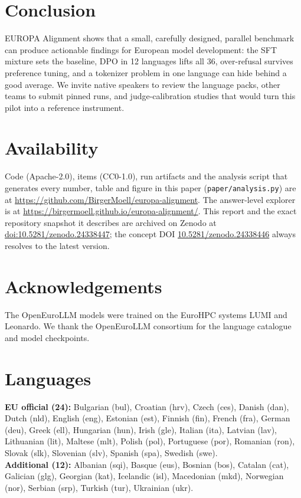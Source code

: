\documentclass[11pt]{article}
\begin{document}
\section{Conclusion}
EUROPA Alignment shows that a small, carefully designed, parallel benchmark can produce actionable findings for European model development: the SFT mixture sets the baseline, DPO in 12 languages lifts all 36, over-refusal survives preference tuning, and a tokenizer problem in one language can hide behind a good average. We invite native speakers to review the language packs, other teams to submit pinned runs, and judge-calibration studies that would turn this pilot into a reference instrument.

\section*{Availability}
\label{sec:availability}
Code (Apache-2.0), items (CC0-1.0), run artifacts and the analysis script that generates every number, table and figure in this paper (\texttt{paper/analysis.py}) are at \url{https://github.com/BirgerMoell/europa-alignment}. The answer-level explorer is at \url{https://birgermoell.github.io/europa-alignment/}. This report and the exact repository snapshot it describes are archived on Zenodo at \href{https://doi.org/10.5281/zenodo.24338447}{doi:10.5281/zenodo.24338447}; the concept DOI \href{https://doi.org/10.5281/zenodo.24338446}{10.5281/zenodo.24338446} always resolves to the latest version.

\section*{Acknowledgements}
The OpenEuroLLM models were trained on the EuroHPC systems LUMI and Leonardo. We thank the OpenEuroLLM consortium for the language catalogue and model checkpoints.




\appendix
\section{Languages}
\label{app:languages}
\small
\noindent\textbf{EU official (24):} Bulgarian (bul), Croatian (hrv), Czech (ces), Danish (dan), Dutch (nld), English (eng), Estonian (est), Finnish (fin), French (fra), German (deu), Greek (ell), Hungarian (hun), Irish (gle), Italian (ita), Latvian (lav), Lithuanian (lit), Maltese (mlt), Polish (pol), Portuguese (por), Romanian (ron), Slovak (slk), Slovenian (slv), Spanish (spa), Swedish (swe).\\
\textbf{Additional (12):} Albanian (sqi), Basque (eus), Bosnian (bos), Catalan (cat), Galician (glg), Georgian (kat), Icelandic (isl), Macedonian (mkd), Norwegian (nor), Serbian (srp), Turkish (tur), Ukrainian (ukr).
\normalsize
\end{document}
